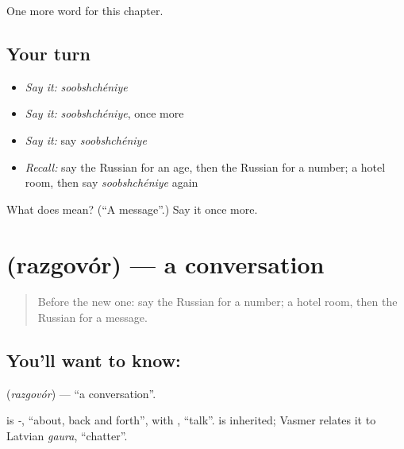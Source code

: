 \begin{grammarlens}[title={What you've built}]
One more word for this chapter.
\end{grammarlens}

\subsection*{Your turn}
\begin{itemize}
\raggedright
  \item \emph{Say it:} \emph{soobshchéniye}
  \item \emph{Say it:} \emph{soobshchéniye}, once more
  \item \emph{Say it:} say \emph{soobshchéniye}
  \item \emph{Recall:} say the Russian for an age, then the Russian for a number; a hotel room, then say \emph{soobshchéniye} again
\end{itemize}

\begin{tcolorbox}[breakable,colback=teal!4,colframe=teal!35!black,title={Before you move on}]
What does  mean? (\textquotedblleft{}A message\textquotedblright{}.) Say it once more.
\end{tcolorbox}
\section[\texorpdfstring{\ru{разговор} (razgovór)}{разговор (razgovór)}]{ (razgovór) — a conversation}

\label{lesson:RU-C255-razgovor}



\begin{quote}
Before the new one: say the Russian for a number; a hotel room, then the Russian for a message.
\end{quote}

\subsection*{You'll want to know: }
\textbf{} (\emph{razgovór}) — \textquotedblleft{}a conversation\textquotedblright{}.

\begin{cousinweb}
\textbf{} is \emph{-}, \textquotedblleft{}about, back and forth\textquotedblright{}, with \emph{}, \textquotedblleft{}talk\textquotedblright{}. \emph{} is inherited; Vasmer relates it to Latvian \emph{gaura}, \textquotedblleft{}chatter\textquotedblright{}.
\end{cousinweb}

